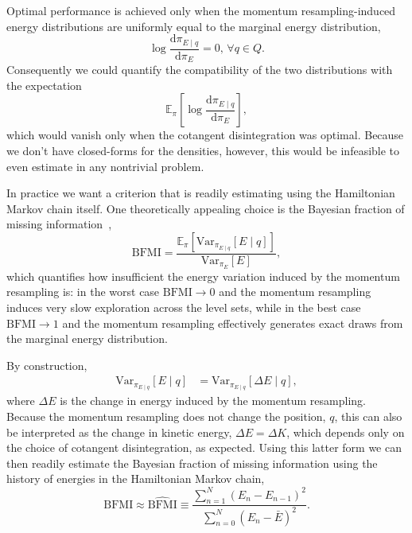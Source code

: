 \documentclass[stslayout]{imsart}
\newcommand\dd{\mathrm{d}}
\begin{document}
Optimal performance is achieved only when the momentum resampling-induced 
energy distributions are uniformly equal to the marginal energy distribution,
%
\begin{equation*}
\log \frac{ \dd \pi_{E \mid q} }{ \dd \pi_{E} } = 0, \, \forall q \in Q.
\end{equation*}
%
Consequently we could quantify the compatibility of the two distributions
with the expectation
%
\begin{equation*}
\mathbb{E}_{\pi} \! \left[
\log \frac{ \dd \pi_{E \mid q} }{ \dd \pi_{E} } \right],
\end{equation*}
%
which would vanish only when the cotangent disintegration was optimal.
Because we don't have closed-forms for the densities, however, this
would be infeasible to even estimate in any nontrivial problem.

In practice we want a criterion that is readily estimating using the
Hamiltonian Markov chain itself.  One theoretically appealing choice
is the Bayesian fraction of missing information~\citep{Rubin:2004},
%
\begin{equation*}
\mathrm{BFMI} = 
\frac{ \mathbb{E}_{\pi} \! 
\left[ \mathrm{Var}_{ \pi_{E \mid q} } \! \left[ E \mid q \right] \right] }
{ \mathrm{Var}_{ \pi_{E} } \! \left[ E \right] },
\end{equation*}
%
which quantifies how insufficient the energy variation induced by the 
momentum resampling is: in the worst case $\mathrm{BFMI} \rightarrow 0$ 
and the momentum resampling induces very slow exploration across the 
level sets, while in the best case $\mathrm{BFMI} \rightarrow 1$ and the 
momentum resampling effectively generates exact draws from the marginal 
energy distribution.

By construction,
%
\begin{align*}
\mathrm{Var}_{ \pi_{E \mid q} } \! \left[ E \mid q \right]
&=
\mathrm{Var}_{ \pi_{E \mid q} } \! \left[ \Delta E \mid q \right],
\end{align*}
%
where $\Delta E$ is the change in energy induced by the momentum
resampling.  Because the momentum resampling does not change
the position, $q$, this can also be interpreted as the change in
kinetic energy, $\Delta E = \Delta K$, which depends only on the
choice of cotangent disintegration, as expected.  Using this latter form
we can then readily estimate the Bayesian fraction of missing information 
using the history of energies in the Hamiltonian Markov chain,
%
\begin{equation*}
\mathrm{BFMI}
\approx
\widehat{\mathrm{BFMI}} 
\equiv
\frac{ \sum_{n = 1}^{N} \left( E_{n} - E_{n - 1} \right)^{2} }
{ \sum_{n = 0}^{N} \left( E_{n} - \bar{E} \right)^{2} }.
\end{equation*}
\end{document}

